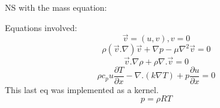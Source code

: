\documentclass[11pt,letterpaper]{article}
\begin{document}
NS with the mass equation:

Equations involved:
\begin{equation}
\vec{v}=(u,v), v = 0
\end{equation}
\begin{equation}
\rho (\vec{v}.\nabla)\vec{v} + \nabla p - \mu \nabla^{2}\vec{v} = 0
\end{equation}
\begin{equation}
\vec{v}.\nabla \rho + \rho \nabla.\vec{v}=0
\end{equation}
\begin{equation}
\rho c_{p} u \frac{\partial T}{\partial x} - \nabla .(k\nabla T) + p \frac{\partial u}{\partial x} = 0
\end{equation}
This last eq was implemented as a kernel.
\begin{equation}
p = \rho R T
\end{equation}

\pagebreak 


\end{document}
